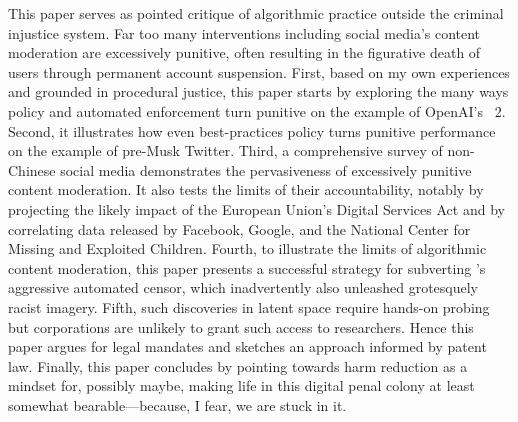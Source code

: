 This paper serves as pointed critique of algorithmic practice outside the
criminal injustice system. Far too many interventions including social media's
content moderation are excessively punitive, often resulting in the figurative
death of users through permanent account suspension. First, based on my own
experiences and grounded in procedural justice, this paper starts by exploring
the many ways policy and automated enforcement turn punitive on the example of
OpenAI's \DALLE\ 2. Second, it illustrates how even best-practices policy turns
punitive performance on the example of pre-Musk Twitter. Third, a comprehensive
survey of non-Chinese social media demonstrates the pervasiveness of excessively
punitive content moderation. It also tests the limits of their accountability,
notably by projecting the likely impact of the European Union's Digital Services
Act and by correlating data released by Facebook, Google, and the National
Center for Missing and Exploited Children. Fourth, to illustrate the limits of
algorithmic content moderation, this paper presents a successful strategy for
subverting \DALLE's aggressive automated censor, which inadvertently also
unleashed grotesquely racist imagery. Fifth, such discoveries in latent space
require hands-on probing but corporations are unlikely to grant such access to
researchers. Hence this paper argues for legal mandates and sketches an approach
informed by patent law. Finally, this paper concludes by pointing towards harm
reduction as a mindset for, possibly maybe, making life in this digital penal
colony at least somewhat bearable---because, I fear, we are stuck in it.
